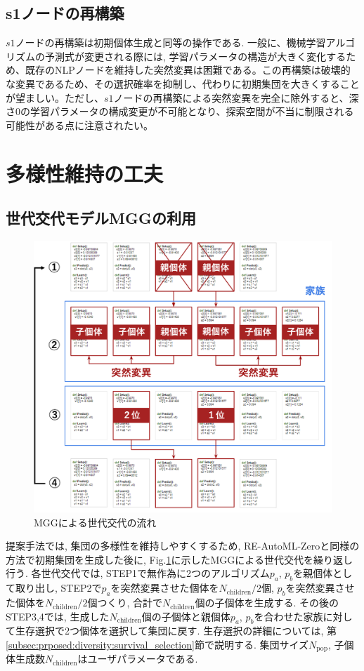 \documentclass[11pt,oneside,openany,report]{jsbook}
\begin{document}
\subsection{s1ノードの再構築}
$s1$ノードの再構築は初期個体生成と同等の操作である. 一般に、機械学習アルゴリズムの予測式が変更される際には, 学習パラメータの構造が大きく変化するため、既存のNLPノードを維持した突然変異は困難である。この再構築は破壊的な変異であるため、その選択確率を抑制し、代わりに初期集団を大きくすることが望ましい。ただし、$s1$ノードの再構築による突然変異を完全に除外すると、深さ0の学習パラメータの構成変更が不可能となり、探索空間が不当に制限される可能性がある点に注意されたい。

\section{多様性維持の工夫}\label{sec:proposed:diversity}

\subsection{世代交代モデルMGGの利用}

\begin{figure}[tbp]
  \centering
  \includegraphics[width=14cm]{mgg_automl_zero_vag/ag/mgg.png}
  \caption{MGGによる世代交代の流れ}
  \label{fig:mgg}
\end{figure}

提案手法では, 集団の多様性を維持しやすくするため, RE-AutoML-Zeroと同様の方法で初期集団を生成した後に, Fig.\ref{fig:mgg}に示したMGGによる世代交代を繰り返し行う. 各世代交代では, STEP1で無作為に2つのアルゴリズム$p_a$, $p_b$を親個体として取り出し, STEP2で$p_a$を突然変異させた個体を$N_\mathrm{children} / 2$個, $p_b$を突然変異させた個体を$N_\mathrm{children} / 2$個つくり, 合計で$N_\mathrm{children}$個の子個体を生成する. その後のSTEP3,4では, 生成した$N_\mathrm{children}$個の子個体と親個体$p_a$, $p_b$を合わせた家族に対して生存選択で2つ個体を選択して集団に戻す. 生存選択の詳細については, 第\ref{subsec:prposed:diversity:survival_selection}節で説明する. 集団サイズ$N_\mathrm{pop}$, 子個体生成数$N_\mathrm{children}$はユーザパラメータである.
\end{document}
